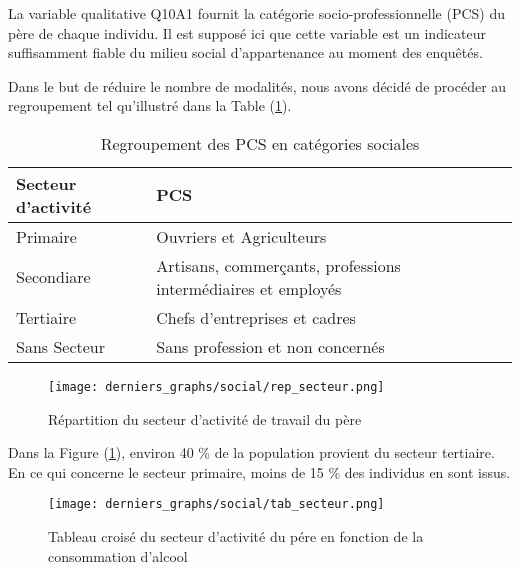 \documentclass{article}
\begin{document}
La variable qualitative Q10A1 fournit la catégorie socio-professionnelle (PCS) du père de chaque individu. Il est supposé ici que cette variable est un indicateur suffisamment fiable du milieu social d'appartenance au moment des enquêtés.

Dans le but de réduire le nombre de modalités, nous avons décidé de procéder au regroupement tel qu'illustré dans la Table (\ref{calssesocio}).
\begin{table}[H]
    \centering
    \begin{tabular}{l|l}
        \toprule
        \textbf{Secteur d'activité} & \textbf{PCS} \\
        \midrule
        Primaire & Ouvriers et Agriculteurs \\
        Secondiare & Artisans, commerçants, professions intermédiaires et employés \\
        Tertiaire & Chefs d'entreprises et cadres \\
        Sans Secteur & Sans profession et non concernés \\
        \bottomrule
    \end{tabular}
    \caption{Regroupement des PCS en catégories sociales}
    \label{calssesocio}
\end{table}

\begin{figure}[H]
    \centering
    \texttt{[image: derniers\_graphs/social/rep\_secteur.png]}
    \caption{Répartition du secteur d'activité de travail du père}
    \label{fig:Sociofig33}
\end{figure}

Dans la Figure (\ref{fig:Sociofig33}), environ 40 \% de la population provient du secteur tertiaire. En ce qui concerne le secteur primaire, moins de 15 \% des individus en sont issus.



\begin{figure}[H]
  \centering
  \texttt{[image: derniers\_graphs/social/tab\_secteur.png]} 
  \caption{Tableau croisé du secteur d'activité du pére en fonction de la consommation d'alcool}

  \label{fig:sociofig2}
\end{figure}
\end{document}
